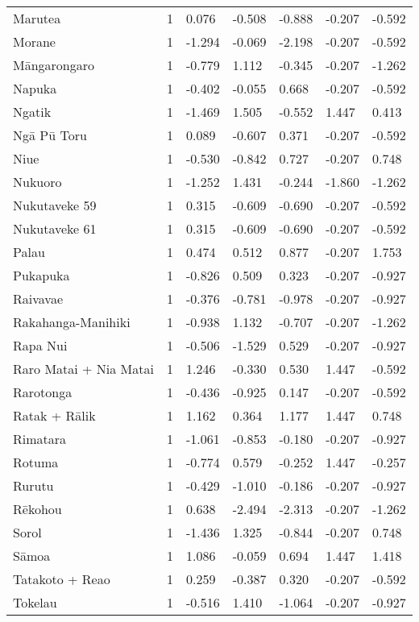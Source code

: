 \begin{longtable}{p{4.5cm}p{1.4cm}p{1.4cm}p{1.7cm}p{1.7cm}p{1.7cm}p{1.7cm}}
  Marutea & 1 & 0.076 & -0.508 & -0.888 & -0.207 & -0.592 \\ 
  Morane & 1 & -1.294 & -0.069 & -2.198 & -0.207 & -0.592 \\ 
  Māngarongaro & 1 & -0.779 & 1.112 & -0.345 & -0.207 & -1.262 \\ 
  Napuka & 1 & -0.402 & -0.055 & 0.668 & -0.207 & -0.592 \\ 
  Ngatik & 1 & -1.469 & 1.505 & -0.552 & 1.447 & 0.413 \\ 
  Ngā Pū Toru & 1 & 0.089 & -0.607 & 0.371 & -0.207 & -0.592 \\ 
  Niue & 1 & -0.530 & -0.842 & 0.727 & -0.207 & 0.748 \\ 
  Nukuoro & 1 & -1.252 & 1.431 & -0.244 & -1.860 & -1.262 \\ 
  Nukutaveke 59 & 1 & 0.315 & -0.609 & -0.690 & -0.207 & -0.592 \\ 
  Nukutaveke 61 & 1 & 0.315 & -0.609 & -0.690 & -0.207 & -0.592 \\ 
  Palau & 1 & 0.474 & 0.512 & 0.877 & -0.207 & 1.753 \\ 
  Pukapuka & 1 & -0.826 & 0.509 & 0.323 & -0.207 & -0.927 \\ 
  Raivavae & 1 & -0.376 & -0.781 & -0.978 & -0.207 & -0.927 \\ 
  Rakahanga-Manihiki & 1 & -0.938 & 1.132 & -0.707 & -0.207 & -1.262 \\ 
  Rapa Nui & 1 & -0.506 & -1.529 & 0.529 & -0.207 & -0.927 \\ 
  Raro Matai + Nia Matai & 1 & 1.246 & -0.330 & 0.530 & 1.447 & -0.592 \\ 
  Rarotonga & 1 & -0.436 & -0.925 & 0.147 & -0.207 & -0.592 \\ 
  Ratak + Rālik & 1 & 1.162 & 0.364 & 1.177 & 1.447 & 0.748 \\ 
  Rimatara & 1 & -1.061 & -0.853 & -0.180 & -0.207 & -0.927 \\ 
  Rotuma & 1 & -0.774 & 0.579 & -0.252 & 1.447 & -0.257 \\ 
  Rurutu & 1 & -0.429 & -1.010 & -0.186 & -0.207 & -0.927 \\ 
  Rēkohou & 1 & 0.638 & -2.494 & -2.313 & -0.207 & -1.262 \\ 
  Sorol & 1 & -1.436 & 1.325 & -0.844 & -0.207 & 0.748 \\ 
  Sāmoa & 1 & 1.086 & -0.059 & 0.694 & 1.447 & 1.418 \\ 
  Tatakoto + Reao & 1 & 0.259 & -0.387 & 0.320 & -0.207 & -0.592 \\ 
  Tokelau & 1 & -0.516 & 1.410 & -1.064 & -0.207 & -0.927 \\ 

\end{longtable}
